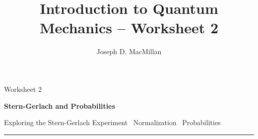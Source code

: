 \documentclass[10pt, letterpaper, twoside, openany]{article}
\title{Introduction to Quantum Mechanics -- Worksheet 2}
\author{Joseph D. MacMillan}
\date{}
\begin{document}
\pagestyle{fancy}

\Large \noindent Worksheet 2

\noindent \LARGE \textbf{Stern-Gerlach and Probabilities}

\normalsize

\vspace{0.2in}

\noindent Exploring the Stern-Gerlach Experiment  \bullet \  Normalization   \bullet \  Probabilities  

\vspace{0.1in}

\noindent \rule{\textwidth}{0.5pt}

\vspace{0.2in}
\end{document}
